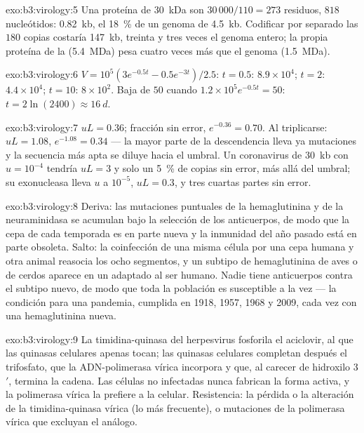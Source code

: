 \begin{solution}{exo:b3:virology:5}
Una proteína de \qty{30}{kDa} son $30\,000/110 = 273$ residuos, $818$
nucleótidos: \qty{0.82}{kb}, el \qty{18}{\%} de un genoma de
\qty{4.5}{kb}. Codificar por separado las $180$ copias costaría
\qty{147}{kb}, treinta y tres veces el genoma entero; la propia proteína
de la  (\qty{5.4}{MDa}) pesa cuatro veces más que el genoma
(\qty{1.5}{MDa}).
\end{solution}

\begin{solution}{exo:b3:virology:6}
$V = 10^{5}(3e^{-0.5t} - 0.5e^{-3t})/2.5$: $t = 0.5$: $8.9\times
10^{4}$; $t = 2$: $4.4\times 10^{4}$; $t = 10$: $8\times 10^{2}$. Baja de
$50$ cuando $1.2\times 10^{5}e^{-0.5t} = 50$: $t = 2\ln(2400) \approx
\qty{16}{d}$.
\end{solution}

\begin{solution}{exo:b3:virology:7}
$uL = 0.36$; fracción sin error, $e^{-0.36} = 0.70$. Al triplicarse:
$uL =
1.08$, $e^{-1.08} = 0.34$ --- la mayor parte de la descendencia lleva ya
mutaciones y la secuencia más apta se diluye hacia el umbral. Un
coronavirus de \qty{30}{kb} con $u = 10^{-4}$ tendría $uL = 3$ y solo un
\qty{5}{\%} de copias sin error, más allá del umbral; su exonucleasa
lleva $u$ a $10^{-5}$, $uL = 0.3$, y tres cuartas partes sin error.
\end{solution}

\begin{solution}{exo:b3:virology:8}
Deriva: las mutaciones puntuales de la hemaglutinina y de la
neuraminidasa se acumulan bajo la selección de los anticuerpos, de modo
que la cepa de cada temporada es en parte nueva y la inmunidad del año
pasado está en parte obsoleta. Salto: la coinfección de una misma célula
por una cepa humana y otra animal reasocia los ocho segmentos, y un
subtipo de hemaglutinina de aves o de cerdos aparece en un  adaptado
al ser humano. Nadie tiene anticuerpos contra el subtipo nuevo, de modo
que toda la población es susceptible a la vez --- la condición para una
pandemia, cumplida en 1918, 1957, 1968 y 2009, cada vez con una
hemaglutinina nueva.
\end{solution}

\begin{solution}{exo:b3:virology:9}
La timidina-quinasa del herpesvirus fosforila el aciclovir, al que las
quinasas celulares apenas tocan; las quinasas celulares completan después
el trifosfato, que la ADN-polimerasa vírica incorpora y que, al carecer
de hidroxilo 3$'$, termina la cadena. Las células no infectadas nunca
fabrican la forma activa, y la polimerasa vírica la prefiere a la
celular. Resistencia: la pérdida o la alteración de la timidina-quinasa
vírica (lo más frecuente), o mutaciones de la polimerasa vírica que
excluyan el análogo.
\end{solution}

